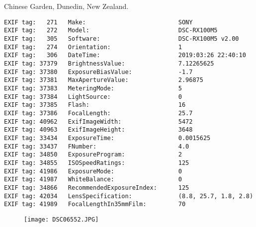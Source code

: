 \section{\protect{}}
\noindent Chinese Garden, Dunedin, New Zealand.
\noindent
\begin{lstlisting}
EXIF tag:   271   Make:                          SONY
EXIF tag:   272   Model:                         DSC-RX100M5
EXIF tag:   305   Software:                      DSC-RX100M5 v2.00
EXIF tag:   274   Orientation:                   1
EXIF tag:   306   DateTime:                      2019:03:26 22:40:10
EXIF tag: 37379   BrightnessValue:               7.12265625
EXIF tag: 37380   ExposureBiasValue:             -1.7
EXIF tag: 37381   MaxApertureValue:              2.96875
EXIF tag: 37383   MeteringMode:                  5
EXIF tag: 37384   LightSource:                   0
EXIF tag: 37385   Flash:                         16
EXIF tag: 37386   FocalLength:                   25.7
EXIF tag: 40962   ExifImageWidth:                5472
EXIF tag: 40963   ExifImageHeight:               3648
EXIF tag: 33434   ExposureTime:                  0.0015625
EXIF tag: 33437   FNumber:                       4.0
EXIF tag: 34850   ExposureProgram:               2
EXIF tag: 34855   ISOSpeedRatings:               125
EXIF tag: 41986   ExposureMode:                  0
EXIF tag: 41987   WhiteBalance:                  0
EXIF tag: 34866   RecommendedExposureIndex:      125
EXIF tag: 42034   LensSpecification:             (8.8, 25.7, 1.8, 2.8)
EXIF tag: 41989   FocalLengthIn35mmFilm:         70

\end{lstlisting}
\clearpage
\begin{figure}
\raggedleft
\texttt{[image: DSC06552.JPG]}
\end{figure}


\clearpage
